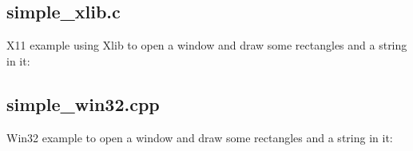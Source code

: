 \documentclass{article}
\begin{document}
\subsection{simple\_xlib.c}
\label{subsec:simple_xlib.c}

X11 example using Xlib to open a window and draw some rectangles and a string
in it:



\subsection{simple\_win32.cpp}
\label{subsec:simple_win32.cpp}

Win32 example to open a window and draw some rectangles and a string in it:


\end{document}
